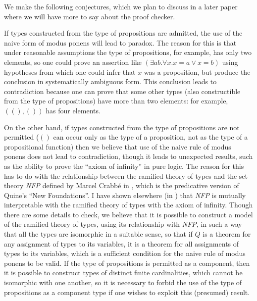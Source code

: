 \documentclass{article}
\begin{document}
We make the following conjectures, which we plan to discuss in a later
paper where we will have more to say about the proof checker.

If types constructed from the type of propositions are admitted, the
use of the naive form of modus ponens will lead to paradox.  The
reason for this is that under reasonable assumptions the type of
propositions, for example, has only two elements, so one could prove
an assertion like $(\exists ab.\forall x.x=a \vee x=b)$ using
hypotheses from which one could infer that $x$ was a proposition, but
produce the conclusion in systematically ambiguous form.  This
conclusion leads to contradiction because one can prove that some
other types (also constructible from the type of propositions) have
more than two elements: for example, $((),())$ has four elements.

On the other hand, if types constructed from the type of propositions
are not permitted ($()$ can occur only as the type of a proposition,
not as the type of a propositional function) then we believe that use
of the naive rule of modus ponens does not lead to contradiction,
though it leads to unexpected results, such as the ability to prove
the ``axiom of infinity'' in pure logic.  The reason for this has to
do with the relationship between the ramified theory of types and the
set theory {\em NFP\/} defined by Marcel Crabb\'e in \cite{nfp}, which
is the predicative version of Quine's ``New Foundations''.  I have
shown elsewhere (in \cite{ndjfl}) that {\em NFP\/} is mutually
interpretable with the ramified theory of types with the axiom of
infinity.  Though there are some details to check, we believe that it
is possible to construct a model of the ramified theory of types,
using its relationship with {\em NFP\/}, in such a way that all the
types are isomorphic in a suitable sense, so that if $Q$ is a theorem
for any assignment of types to its variables, it is a theorem for all
assignments of types to its variables, which is a sufficient condition
for the naive rule of modus ponens to be valid.  If the type of
propositions is permitted as a component, then it is possible to
construct types of distinct finite cardinalities, which cannot be
isomorphic with one another, so it is necessary to forbid the use of
the type of propositions as a component type if one wishes to exploit
this (presumed) result.  
\end{document}

